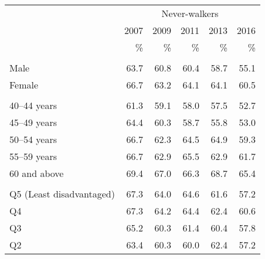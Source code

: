 \documentclass[
]{book}
\begin{document}
\begin{table}
\centering\begingroup\fontsize{15}{17}\selectfont

\begin{tabular}{lrrrrr}
\toprule
\multicolumn{1}{c}{ } & \multicolumn{5}{c}{Never-walkers} \\
\cmidrule(l{3pt}r{3pt}){2-6}
\multicolumn{1}{c}{ } & \multicolumn{1}{c}{2007} & \multicolumn{1}{c}{2009} & \multicolumn{1}{c}{2011} & \multicolumn{1}{c}{2013} & \multicolumn{1}{c}{2016} \\
\cmidrule(l{3pt}r{3pt}){2-2} \cmidrule(l{3pt}r{3pt}){3-3} \cmidrule(l{3pt}r{3pt}){4-4} \cmidrule(l{3pt}r{3pt}){5-5} \cmidrule(l{3pt}r{3pt}){6-6}
  & \% & \% & \% & \% & \%\\
\midrule
\addlinespace[0.3em]
\multicolumn{6}{l}{\textbf{Sex}}\\
\hspace{1em}Male & 63.7 & 60.8 & 60.4 & 58.7 & 55.1\\
\hspace{1em}Female & 66.7 & 63.2 & 64.1 & 64.1 & 60.5\\
\addlinespace[0.3em]
\multicolumn{6}{l}{\textbf{Age group}}\\
\hspace{1em}40–44 years & 61.3 & 59.1 & 58.0 & 57.5 & 52.7\\
\hspace{1em}45–49 years & 64.4 & 60.3 & 58.7 & 55.8 & 53.0\\
\hspace{1em}50–54 years & 66.7 & 62.3 & 64.5 & 64.9 & 59.3\\
\hspace{1em}55–59 years & 66.7 & 62.9 & 65.5 & 62.9 & 61.7\\
\hspace{1em}60 and above & 69.4 & 67.0 & 66.3 & 68.7 & 65.4\\
\addlinespace[0.3em]
\multicolumn{6}{l}{\textbf{Neighbourhood disadvantage}}\\
\hspace{1em}Q5 (Least disadvantaged) & 67.3 & 64.0 & 64.6 & 61.6 & 57.2\\
\hspace{1em}Q4 & 67.3 & 64.2 & 64.4 & 62.4 & 60.6\\
\hspace{1em}Q3 & 65.2 & 60.3 & 61.4 & 60.4 & 57.8\\
\hspace{1em}Q2 & 63.4 & 60.3 & 60.0 & 62.4 & 57.2\\

\end{tabular}
\end{table}
\end{document}
